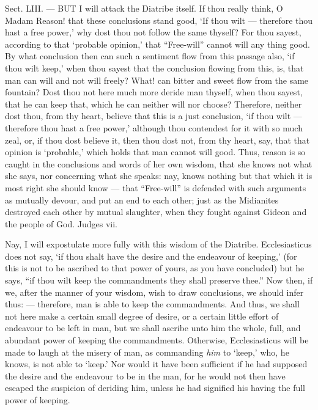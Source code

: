 Sect. LIII. — BUT I will attack the Diatribe itself. If thou really think, O Madam Reason! that these conclusions stand good, ‘If thou wilt — therefore thou hast a free power,’ why dost thou not follow the same thyself? For thou sayest, according to that ‘probable opinion,’ that “Free-will” cannot will any thing good. By what conclusion then can such a sentiment flow from this passage also, ‘if thou wilt keep,’ when thou sayest that the conclusion flowing from this, is, that man can will and not will freely? What! can bitter and sweet flow from the same fountain? Dost thou not here much more deride man thyself, when thou sayest, that he can keep that, which he can neither will nor choose? Therefore, neither dost thou, from thy heart, believe that this is a just conclusion, ‘if thou wilt — therefore thou hast a free power,’ although thou contendest for it with so much zeal, or, if thou dost believe it, then thou dost not, from thy heart, say, that that opinion is ‘probable,’ which holds that man cannot will good. Thus, reason is so caught in the conclusions and words of her own wisdom, that she knows not what she says, nor concerning what she speaks: nay, knows nothing but that which it is most right she should know — that “Free-will” is defended with such arguments as mutually devour, and put an end to each other; just as the Midianites destroyed each other by mutual slaughter, when they fought against Gideon and the people of God. Judges vii.

Nay, I will expostulate more fully with this wisdom of the Diatribe. Ecclesiasticus does not say, ‘if thou shalt have the desire and the endeavour of keeping,’ (for this is not to be ascribed to that power of yours, as you have concluded) but he says, “if thou wilt keep the commandments they shall preserve thee.” Now then, if we, after the manner of your wisdom, wish to draw conclusions, we should infer thus: — therefore, man is able to keep the commandments. And thus, we shall not here make a certain small degree of desire, or a certain little effort of endeavour to be left in man, but we shall ascribe unto him the whole, full, and abundant power of keeping the commandments. Otherwise, Ecclesiasticus will be made to laugh at the misery of man, as commanding \emph{him }to ‘keep,’ who, he knows, is not able to ‘keep.’ Nor would it have been sufficient if he had supposed the desire and the endeavour to be in the man, for he would not then have escaped the suspicion of deriding him, unless he had signified his having the full power of keeping.

